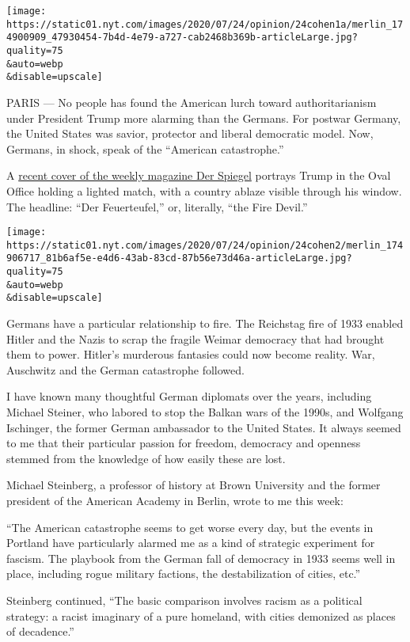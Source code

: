 \texttt{[image: https://static01.nyt.com/images/2020/07/24/opinion/24cohen1a/merlin\_174900909\_47930454-7b4d-4e79-a727-cab2468b369b-articleLarge.jpg?quality=75\\\&auto=webp\\\&disable=upscale]}

PARIS --- No people has found the American lurch toward authoritarianism
under President Trump more alarming than the Germans. For postwar
Germany, the United States was savior, protector and liberal democratic
model. Now, Germans, in shock, speak of the ``American catastrophe.''

A
\href{https://adage.com/article/media/germanys-leading-newsweekly-decries-trumps-incendiary-approach/2261056}{recent
cover of the weekly magazine Der Spiegel} portrays Trump in the Oval
Office holding a lighted match, with a country ablaze visible through
his window. The headline: ``Der Feuerteufel,'' or, literally, ``the Fire
Devil.''

\texttt{[image: https://static01.nyt.com/images/2020/07/24/opinion/24cohen2/merlin\_174906717\_81b6af5e-e4d6-43ab-83cd-87b56e73d46a-articleLarge.jpg?quality=75\\\&auto=webp\\\&disable=upscale]}

Germans have a particular relationship to fire. The Reichstag fire of
1933 enabled Hitler and the Nazis to scrap the fragile Weimar democracy
that had brought them to power. Hitler's murderous fantasies could now
become reality. War, Auschwitz and the German catastrophe followed.

I have known many thoughtful German diplomats over the years, including
Michael Steiner, who labored to stop the Balkan wars of the 1990s, and
Wolfgang Ischinger, the former German ambassador to the United States.
It always seemed to me that their particular passion for freedom,
democracy and openness stemmed from the knowledge of how easily these
are lost.

Michael Steinberg, a professor of history at Brown University and the
former president of the American Academy in Berlin, wrote to me this
week:

``The American catastrophe seems to get worse every day, but the events
in Portland have particularly alarmed me as a kind of strategic
experiment for fascism. The playbook from the German fall of democracy
in 1933 seems well in place, including rogue military factions, the
destabilization of cities, etc.''

Steinberg continued, ``The basic comparison involves racism as a
political strategy: a racist imaginary of a pure homeland, with cities
demonized as places of decadence.''

